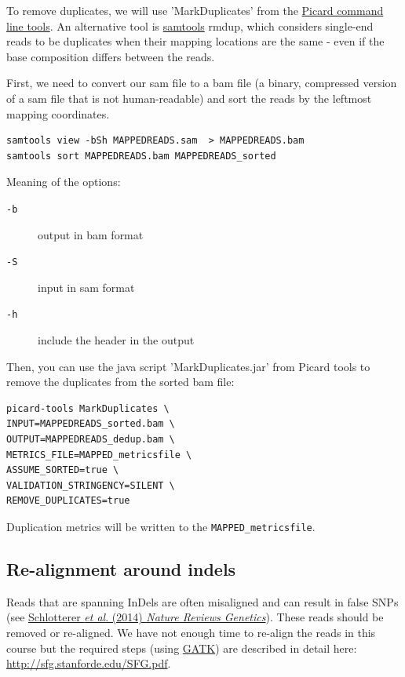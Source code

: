 \documentclass[11pt]{article}
\begin{document}
To remove duplicates, we will use 'MarkDuplicates' from the \href{https://broadinstitute.github.io/picard/command-line-overview.html}{Picard
command line tools}. An alternative tool is \href{http://samtools.sourceforge.net/samtools.shtml}{samtools} rmdup, which
considers single-end reads to be duplicates when their mapping
locations are the same - even if the base composition differs between
the reads.

First, we need to convert our sam file to a bam file (a binary,
compressed version of a sam file that is not human-readable) and sort
the reads by the leftmost mapping coordinates.

\begin{verbatim}
samtools view -bSh MAPPEDREADS.sam  > MAPPEDREADS.bam
samtools sort MAPPEDREADS.bam MAPPEDREADS_sorted
\end{verbatim}

Meaning of the options:
\begin{description}
\item[{\texttt{-b}}] output in bam format
\item[{\texttt{-S}}] input in sam format
\item[{\texttt{-h}}] include the header in the output
\end{description}



Then, you can use the java script 'MarkDuplicates.jar' from Picard
tools to remove the duplicates from the sorted bam file:

\begin{verbatim}
picard-tools MarkDuplicates \
INPUT=MAPPEDREADS_sorted.bam \
OUTPUT=MAPPEDREADS_dedup.bam \
METRICS_FILE=MAPPED_metricsfile \
ASSUME_SORTED=true \
VALIDATION_STRINGENCY=SILENT \
REMOVE_DUPLICATES=true
\end{verbatim}

Duplication metrics will be written to the \texttt{MAPPED\_metricsfile}.


\subsection{Re-alignment around indels}
\label{sec-2-2}
Reads that are spanning InDels are often misaligned and can result in
false SNPs (see \href{http://www.nature.com/nrg/journal/v15/n11/full/nrg3803.html}{Schlotterer \emph{et al}. (2014) \emph{Nature Reviews
Genetics}}). These reads should be removed or re-aligned. We have not
enough time to re-align the reads in this course but the required
steps (using \href{https://www.broadinstitute.org/gatk/}{GATK}) are described in detail here:
\url{http://sfg.stanforde.edu/SFG.pdf}.
\end{document}

